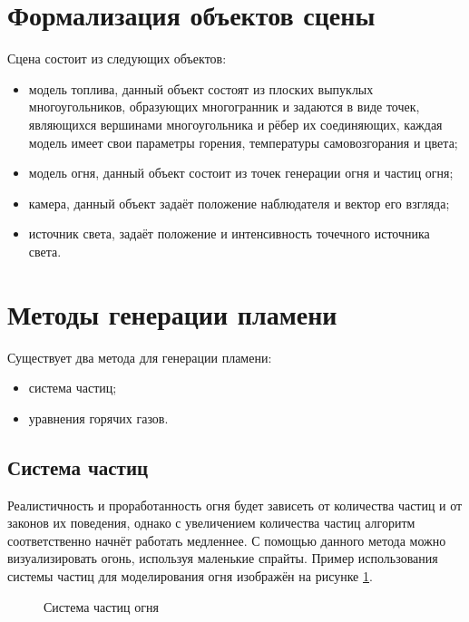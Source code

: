 \documentclass[a4paper,14pt]{report}
\begin{document}
\section{Формализация объектов сцены} 
Сцена состоит из следующих объектов:
\begin{itemize}
\item модель топлива, данный объект состоят из плоских выпуклых многоугольников, образующих многогранник и задаются в виде точек, являющихся вершинами многоугольника и рёбер их соединяющих, каждая модель имеет свои параметры горения, температуры самовозгорания и цвета;
\item модель огня, данный объект состоит из точек генерации огня и частиц огня;
\item камера, данный объект задаёт положение наблюдателя и вектор его взгляда;
\item источник света, задаёт положение и интенсивность точечного источника света.
\end{itemize}

\section{Методы генерации пламени}
Существует два метода для генерации пламени:
\begin{itemize}
\item система частиц;
\item уравнения горячих газов.
\end{itemize}

\subsection{Система частиц}
Реалистичность и проработанность огня будет зависеть от количества частиц и от законов их поведения, однако с увеличением количества частиц алгоритм соответственно начнёт работать медленнее. С помощью данного метода можно визуализировать огонь, используя маленькие спрайты.
Пример использования системы частиц для моделирования огня изображён на рисунке \ref{fig:fire}.
\begin{figure}[H]
 \caption{Система частиц огня}
 \label{fig:fire}
\end{figure}
\end{document}
